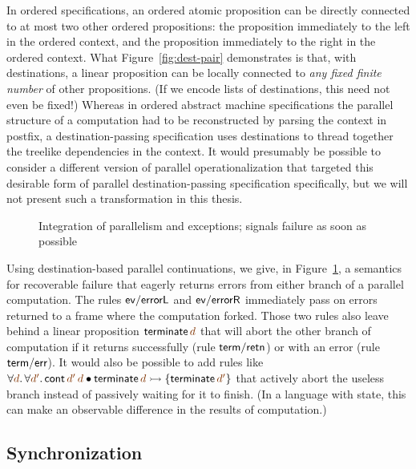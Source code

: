 In ordered specifications, an ordered atomic proposition can be
directly connected to at most two other ordered propositions: the
proposition immediately to the left in the ordered context, and the
proposition immediately to the right in the ordered context. What
Figure~\ref{fig:dest-pair} demonstrates is that, with destinations, a
linear proposition can be locally connected to {\it any fixed finite
  number} of other propositions. (If we encode lists of
  destinations, this need not even be fixed!) Whereas in ordered
abstract machine specifications the parallel structure of a
computation had to be reconstructed by parsing the context in postfix,
a destination-passing specification uses destinations to thread
together the treelike dependencies in the context. It would presumably
be possible to consider a different version of parallel
operationalization that targeted this desirable form of parallel
destination-passing specification specifically, but we will not
present such a transformation in this thesis.

\begin{figure}
\caption{Integration of parallelism and exceptions; signals failure as
  soon as possible}
\label{fig:dest-fail-paror}
\end{figure}

Using destination-based parallel continuations, we give, in
Figure~\ref{fig:dest-fail-paror}, a semantics for recoverable failure
that eagerly returns errors from either branch of a parallel
computation. The rules ${\sf ev/errorL}$ and ${\sf ev/errorR}$
immediately pass on errors returned to a frame where the computation
forked.  Those two rules also leave behind a linear proposition ${\sf
  terminate}\,\lf{d}$ that will abort the other branch of computation if it
returns successfully (rule ${\sf term/retn}$) or with an error (rule
${\sf term/err}$). It would also be possible to add rules
like $\forall \lf{d}.\,\forall\lf{d'}.\,{\sf cont}\,\lf{d'}\,\lf{d} \fuse {\sf terminate}\,\lf{d} \lefti \{ {\sf
  terminate}\,\lf{d'} \}$ that actively abort the useless branch instead
of passively waiting for it to finish. (In a language with state, this 
can make an observable difference in the results of computation.)

\subsection{Synchronization}
\label{sec:dest-synch}

